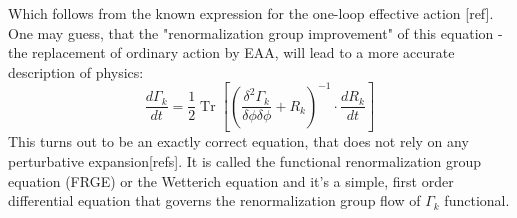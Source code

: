 \documentclass[11pt, a4paper]{article}
\begin{document}
Which follows from the known expression for the one-loop effective action [ref].
One may guess, that the "renormalization group improvement" of this equation - the replacement of ordinary action by
 EAA, will lead to a more accurate description of physics:
\begin{equation}
    \frac{d \Gamma_k}{dt} = \frac{1}{2} \operatorname{Tr} \left[ \left(\frac{\delta^2 \Gamma_k}{\delta \phi \delta \phi} + R_k\right)^{-1} \cdot \frac{d R_k}{dt} \right]
    \label{FRGE}
\end{equation}
This turns out to be an exactly correct equation, that does not rely on any perturbative expansion[refs].
It is called the functional renormalization group equation (FRGE) or the Wetterich equation and
it's a simple, first order differential equation that governs the renormalization group flow of $\Gamma_k$ functional.
\end{document}
